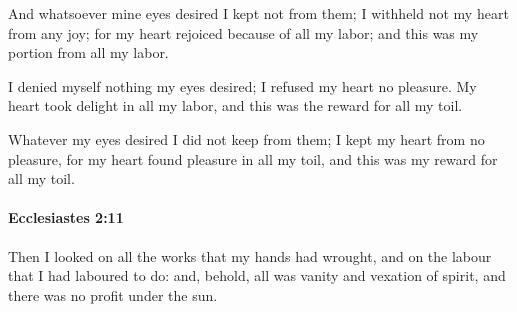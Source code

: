 			\begin{versebox}
					\item[BHS] 
					\item[LXX] 
					\item[ASV] And whatsoever mine eyes desired I kept not from them; I withheld not my heart from any joy; for my heart rejoiced because of all my labor; and this was my portion from all my labor.
					\item[NIV] I denied myself nothing my eyes desired; I refused my heart no pleasure. My heart took delight in all my labor, and this was the reward for all my toil.
					\item[NRSV] Whatever my eyes desired I did not keep from them; I kept my heart from no pleasure, for my heart found pleasure in all my toil, and this was my reward for all my toil.
			\end{versebox}

		\paragraph{Ecclesiastes 2:11} %
			\label{ECCLESIASTES-2-11}

			Then I looked on all the works that my hands had wrought, and on the labour that I had laboured to do: and, behold, all was vanity and vexation of spirit, and there was no profit under the sun.


